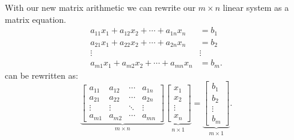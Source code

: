 \documentclass{report}
\begin{document}
With our new matrix arithmetic we can rewrite our $ m \times  n$ linear system as a matrix equation.\\
\begin{align*}
  a_{11} x_1 + a_{12} x_2 + \cdots + a_{1n} x_n &= b_1 \\
  a_{21} x_1 + a_{22} x_2 + \cdots + a_{2n} x_n &= b_2 \\
  \vdots & \vdots \\
  a_{m1} x_1 + a_{m2} x_2 + \cdots + a_{mn} x_n &= b_m
.\end{align*}
can be rewritten as:
\[
  \underbrace{
\begin{bmatrix}
  a_{11} & a_{12} & \cdots & a_{1n} \\[2pt]
  a_{21} & a_{22} & \cdots & a_{2n} \\[4pt]
  \vdots & \vdots & \ddots & \vdots \\[4pt]
  a_{m1} & a_{m2} & \cdots & a_{mn} 
\end{bmatrix} 
  }_{ m \times  n }
  \underbrace{  
\begin{bmatrix}
  x_1 \\[2pt]
  x_2 \\[2pt]
  \vdots \\[2pt]
  x_n
\end{bmatrix} }_{  n \times  1}  = \underbrace{   \begin{bmatrix} 
  b_1 \\[2pt]
  b_2 \\[2pt]
  \vdots \\[2pt]
  b_m
\end{bmatrix} }_{ m \times  1}
.\] 
\end{document}
